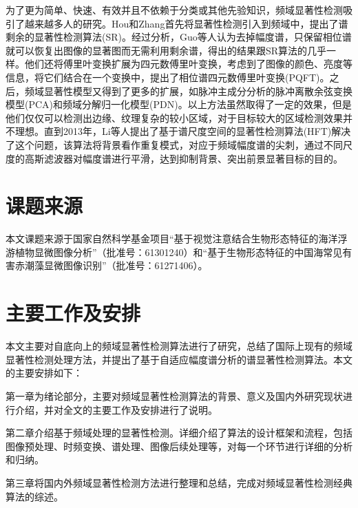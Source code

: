 为了更为简单、快速、有效并且不依赖于分类或其他先验知识，频域显著性检测吸引了越来越多人的研究。Hou和Zhang首先将显著性检测引入到频域中，提出了谱剩余的显著性检测算法(SR)\cite{HouXiaodiCVPR2007Residual}。经过分析，Guo等人\cite{GuoChenleiCVPR2008Spatio}认为去掉幅度谱，只保留相位谱就可以恢复出图像的显著图而无需利用剩余谱，得出的结果跟SR算法的几乎一样。他们还将傅里叶变换扩展为四元数傅里叶变换，考虑到了图像的颜色、亮度等信息，将它们结合在一个变换中，提出了相位谱四元数傅里叶变换(PQFT)。之后，频域显著性模型又得到了更多的扩展，如脉冲主成分分析的脉冲离散余弦变换模型(PCA)\cite{YuICDL2009Spatio}和频域分解归一化模型(PDN)\cite{BianCognNeurodyn2010Visual}。以上方法虽然取得了一定的效果，但是他们仅仅可以检测出边缘、纹理复杂的较小区域，对于目标较大的区域检测效果并不理想。直到2013年，Li等人提出了基于谱尺度空间的显著性检测算法(HFT)\cite{LiJianTPAMI2013Scale}解决了这个问题，该算法将背景看作重复模式，对应于频域幅度谱的尖刺，通过不同尺度的高斯滤波器对幅度谱进行平滑，达到抑制背景、突出前景显著目标的目的。

\section{课题来源}
\label{1_3}

本文课题来源于国家自然科学基金项目“基于视觉注意结合生物形态特征的海洋浮游植物显微图像分析”（批准号：61301240）和“基于生物形态特征的中国海常见有害赤潮藻显微图像识别”（批准号：61271406）。

\section{主要工作及安排}
\label{1_4}

本文主要对自底向上的频域显著性检测算法进行了研究，总结了国际上现有的频域显著性检测处理方法，并提出了基于自适应幅度谱分析的谱显著性检测算法。本文的主要安排如下：

第一章为绪论部分，主要对频域显著性检测算法的背景、意义及国内外研究现状进行介绍，并对全文的主要工作及安排进行了说明。

第二章介绍基于频域处理的显著性检测。详细介绍了算法的设计框架和流程，包括图像预处理、时频变换、谱处理、图像后续处理等，对每一个环节进行详细的分析和归纳。

第三章将国内外频域显著性检测方法进行整理和总结，完成对频域显著性检测经典算法的综述。

